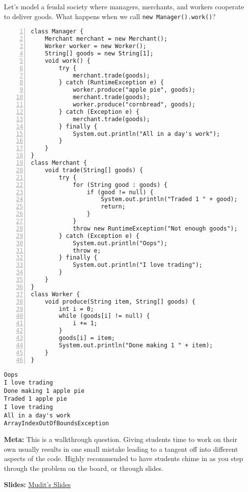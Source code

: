 \begin{blocksection}
\question Let's model a feudal society where managers, merchants, and workers
cooperate to deliver goods. What happens when we call
\lstinline$new Manager().work()$?

\begin{lstlisting}[basicstyle=\ttfamily\footnotesize,
                   numberstyle=\ttfamily\tiny, numbers=left]
class Manager {
    Merchant merchant = new Merchant();
    Worker worker = new Worker();
    String[] goods = new String[1];
    void work() {
        try {
            merchant.trade(goods);
        } catch (RuntimeException e) {
            worker.produce("apple pie", goods);
            merchant.trade(goods);
            worker.produce("cornbread", goods);
        } catch (Exception e) {
            merchant.trade(goods);
        } finally {
            System.out.println("All in a day's work");
        }
    }
}
class Merchant {
    void trade(String[] goods) {
        try {
            for (String good : goods) {
                if (good != null) {
                    System.out.println("Traded 1 " + good);
                    return;
                }
            }
            throw new RuntimeException("Not enough goods");
        } catch (Exception e) {
            System.out.println("Oops");
            throw e;
        } finally {
            System.out.println("I love trading");
        }
    }
}
class Worker {
    void produce(String item, String[] goods) {
        int i = 0;
        while (goods[i] != null) {
            i += 1;
        }
        goods[i] = item;
        System.out.println("Done making 1 " + item);
    }
}
\end{lstlisting}
\end{blocksection}

\begin{solution}
\begin{verbatim}
Oops
I love trading
Done making 1 apple pie
Traded 1 apple pie
I love trading
All in a day's work
ArrayIndexOutOfBoundsException
\end{verbatim}

\textbf{Meta:} This is a walkthrough question. Giving students time to work
on their own usually results in one small mistake leading to a tangent off into
different aspects of the code. Highly recommended to have students chime in
as you step through the problem on the board, or through slides.

\textbf{Slides:}
\href{https://docs.google.com/presentation/d/1j418bduZS2Ltm6dVVg-b3WpGbOGrRUm6DKRkZCByuaQ/edit?usp=sharing}
     {Mudit's Slides}
\end{solution}
